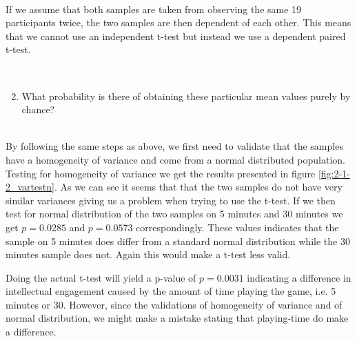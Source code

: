 \hspace{0pt} \\
If we assume that both samples are taken from observing the same 19 participants twice, the two samples are then dependent of each other. This means that we cannot use an independent t-test but instead we use a dependent paired t-test.

\hspace{0pt} \\
\noindent\colorbox{lighter-gray}{\begin{minipage}{0.98\textwidth}
\begin{enumerate}[label=\textbf{(\arabic*)}]\setcounter{enumi}{1}
	\item What probability is there of obtaining these particular mean values purely by chance?
\end{enumerate}\end{minipage}}

\hspace{0pt} \\
By following the same steps as above, we first need to validate that the samples have a homogeneity of variance and come from a normal distributed population. Testing for homogeneity of variance we get the results presented in figure \ref{fig:2-1-2_vartestn}. As we can see it seems that that the two samples do not have very similar variances giving us a problem when trying to use the t-test. If we then test for normal distribution of the two samples on 5 minutes and 30 minutes we get $p=0.0285$ and $p=0.0573$ correspondingly. These values indicates that the sample on 5 minutes does differ from a standard normal distribution while the 30 minutes sample does not. Again this would make a t-test less valid.

Doing the actual t-test will yield a p-value of $p=0.0031$ indicating a difference in intellectual engagement caused by the amount of time playing the game, i.e. 5 minutes or 30. However, since the validations of homogeneity of variance and of normal distribution, we might make a mistake stating that playing-time do make a difference.

